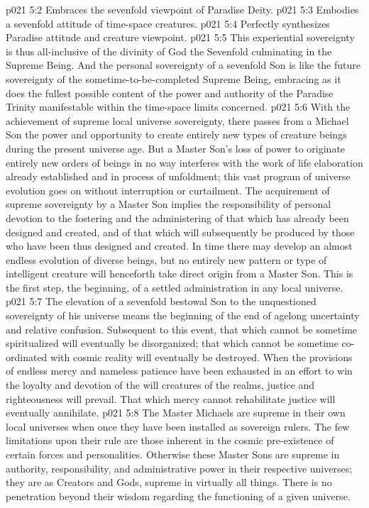 \vs p021 5:2 \bibnobreakspace Embraces the sevenfold viewpoint of Paradise Deity.
\vs p021 5:3 \bibnobreakspace Embodies a sevenfold attitude of time\hyp{}space creatures.
\vs p021 5:4 \bibnobreakspace Perfectly synthesizes Paradise attitude and creature viewpoint.
\vs p021 5:5 \pc This experiential sovereignty is thus all\hyp{}inclusive of the divinity of God the Sevenfold culminating in the Supreme Being. And the personal sovereignty of a sevenfold Son is like the future sovereignty of the sometime\hyp{}to\hyp{}be\hyp{}completed Supreme Being, embracing as it does the fullest possible content of the power and authority of the Paradise Trinity manifestable within the time\hyp{}space limits concerned.
\vs p021 5:6 \pc With the achievement of supreme local universe sovereignty, there passes from a Michael Son the power and opportunity to create entirely new types of creature beings during the present universe age. But a Master Son’s loss of power to originate entirely new orders of beings in no way interferes with the work of life elaboration already established and in process of unfoldment; this vast program of universe evolution goes on without interruption or curtailment. The acquirement of supreme sovereignty by a Master Son implies the responsibility of personal devotion to the fostering and the administering of that which has already been designed and created, and of that which will subsequently be produced by those who have been thus designed and created. In time there may develop an almost endless evolution of diverse beings, but no entirely new pattern or type of intelligent creature will henceforth take direct origin from a Master Son. This is the first step, the beginning, of a settled administration in any local universe.
\vs p021 5:7 The elevation of a sevenfold bestowal Son to the unquestioned sovereignty of his universe means the beginning of the end of agelong uncertainty and relative confusion. Subsequent to this event, that which cannot be sometime spiritualized will eventually be disorganized; that which cannot be sometime co\hyp{}ordinated with cosmic reality will eventually be destroyed. When the provisions of endless mercy and nameless patience have been exhausted in an effort to win the loyalty and devotion of the will creatures of the realms, justice and righteousness will prevail. That which mercy cannot rehabilitate justice will eventually annihilate.
\vs p021 5:8 \pc The Master Michaels are supreme in their own local universes when once they have been installed as sovereign rulers. The few limitations upon their rule are those inherent in the cosmic pre\hyp{}existence of certain forces and personalities. Otherwise these Master Sons are supreme in authority, responsibility, and administrative power in their respective universes; they are as Creators and Gods, supreme in virtually all things. There is no penetration beyond their wisdom regarding the functioning of a given universe.
